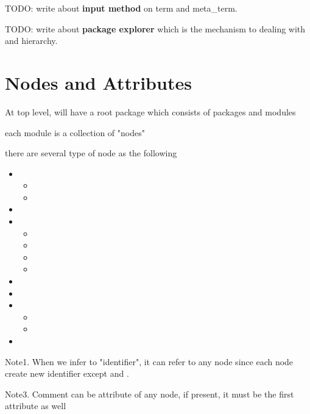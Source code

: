 TODO: write about \textbf{input method} on term and meta\_term.

TODO: write about \textbf{package explorer} which is the mechanism to dealing with  and  hierarchy.

\newpage

\section{Nodes and Attributes}

At top level, will have a root package which consists of packages and modules

each module is a collection of "nodes"

there are several type of node as the following

\begin{itemize}
    \item \kOpen
    \begin{itemize}
        \item \kShowByDefault
        \item \kHideByDefault
    \end{itemize}
    \item \kComment
    \item \kGrammar
    \begin{itemize}
        \item \kInductive
        \item \kLiteral
        \item \kSequence
        \item \kDictionary
    \end{itemize}
    \item \kDefinition
    \item \kAlias
    \item \kRule
    \begin{itemize}
        \item \kInference
        \item \kCompound
    \end{itemize}
    \item \kTheorem
\end{itemize}

Note1. When we infer to "identifier", it can refer to any node since each node create new identifier except \kOpen and \kComment.

Note3. Comment can be attribute of any node, if present, it must be the first attribute as well

